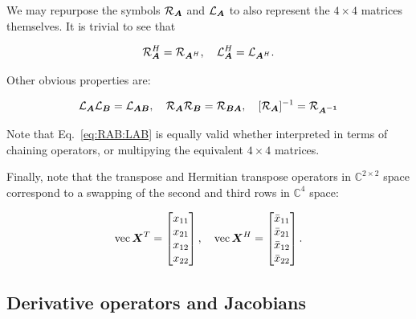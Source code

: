 \documentclass[useAMS,usenatbib]{mn2e}
\newcommand{\COMPLEX}{\mathbb{C}}
\newcommand{\mat}[1]{{\bmath{#1}}}
\begin{document}


We may repurpose the symbols $\Rop{\mat{A}}$ and $\Lop{\mat{A}}$ to also represent the $4\times4$ matrices 
themselves. It is trivial to see that

\begin{equation}
\label{eq:RH:LH}
\Rop{\mat{A}}^H = \Rop{\mat{A}^H},~~~\Lop{\mat{A}}^H = \Lop{\mat{A}^H}.
\end{equation}



Other obvious properties are:

\begin{equation}
\label{eq:RAB:LAB}
\Lop{\mat{A}}\Lop{\mat{B}} = \Lop{\mat{AB}},~~~\Rop{\mat{A}}\Rop{\mat{B}} = \Rop{\mat{BA}},~~~[\Rop{\mat{A}}]^{-1} = \Rop{\mat{A^{-1}}}
\end{equation}

Note that Eq.~\ref{eq:RAB:LAB} is equally valid whether interpreted in terms of chaining operators, or multipying 
the equivalent $4\times4$ matrices.

Finally, note that the transpose and Hermitian transpose operators in $\COMPLEX^{2\times2}$ space correspond to a swapping
of the second and third rows in $\COMPLEX^4$ space:

\begin{equation}
\label{eq:vec:XH}
\VEC{\mat{X}^T} = \Matrix{c}{x_{11}\\x_{21}\\x_{12}\\x_{22}},~~~
\VEC{\mat{X}^H} = \Matrix{c}{\bar{x}_{11}\\\bar{x}_{21}\\\bar{x}_{12}\\\bar{x}_{22}}.
\end{equation}

\subsection{Derivative operators and Jacobians}
\end{document}
